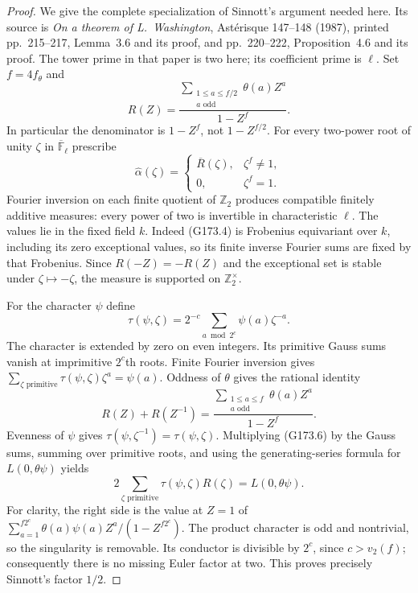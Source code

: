 \begin{proof}
We give the complete specialization of Sinnott's argument needed here.
Its source is \emph{On a theorem of L.~Washington}, Ast\'erisque
147--148 (1987), printed pp.~215--217, Lemma~3.6 and its proof,
and pp.~220--222, Proposition~4.6 and its proof.
The tower prime in that paper is two here; its coefficient prime is
$\ell$.  Set $f=4f_\theta$ and
\[
 R(Z)=\frac{\displaystyle
       \sum_{\substack{1\leq a\leq f/2\\a\text{ odd}}}\theta(a)Z^a}
                                      {1-Z^f}.
 \tag{G173.3}
\]
In particular the denominator is $1-Z^f$, not $1-Z^{f/2}$.
For every two-power root of unity $\zeta$ in
$\overline{\mathbb F}_\ell$ prescribe
\[
 \widehat\alpha(\zeta)=
 \begin{cases}\overline R(\zeta),&\zeta^f\ne1,\\0,&\zeta^f=1.
 \end{cases}
 \tag{G173.4}
\]
Fourier inversion on each finite quotient of $\mathbb Z_2$ produces
compatible finitely additive measures: every power of two is
invertible in characteristic $\ell$.  The values lie in the fixed
field $k$.  Indeed (G173.4) is Frobenius equivariant over $k$, including
its zero exceptional values, so its finite inverse Fourier sums
are fixed by that Frobenius.
Since $R(-Z)=-R(Z)$ and the exceptional set is stable under
$\zeta\mapsto-\zeta$, the measure is supported on
$\mathbb Z_2^\times$.

For the character $\psi$ define
\[
 \tau(\psi,\zeta)=2^{-c}
       \sum_{a\bmod2^c}\psi(a)\zeta^{-a}.
 \tag{G173.5}
\]
The character is extended by zero on even integers.
Its primitive Gauss sums vanish at imprimitive $2^c$th roots.
Finite Fourier inversion gives
$\sum_{\zeta\text{ primitive}}\tau(\psi,\zeta)\zeta^a=\psi(a)$.
Oddness of $\theta$ gives the rational identity
\[
 R(Z)+R(Z^{-1})
  =\frac{\displaystyle\sum_{\substack{1\leq a\leq f\\a\text{ odd}}}
                                     \theta(a)Z^a}{1-Z^f}.
 \tag{G173.6}
\]
Evenness of $\psi$ gives
$\tau(\psi,\zeta^{-1})=\tau(\psi,\zeta)$.
Multiplying (G173.6) by the Gauss sums, summing over primitive roots,
and using the generating-series formula for $L(0,\theta\psi)$ yields
\[
 2\sum_{\zeta\text{ primitive}}\tau(\psi,\zeta)R(\zeta)
                                  =L(0,\theta\psi).
 \tag{G173.7}
\]
For clarity, the right side is the value at $Z=1$ of
$\sum_{a=1}^{f2^c}\theta(a)\psi(a)Z^a/(1-Z^{f2^c})$.
The product character is odd and nontrivial, so the singularity is
removable.  Its conductor is divisible by $2^c$, since
$c>v_2(f)$; consequently there is no missing Euler factor at two.
This proves precisely Sinnott's factor $1/2$.


\end{proof}
